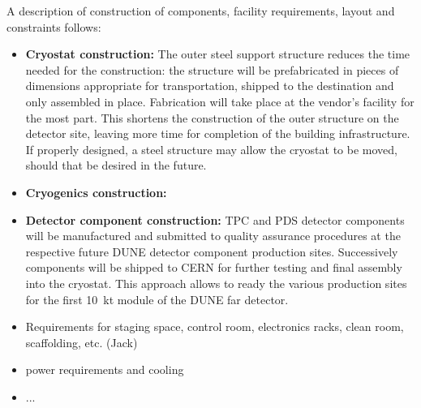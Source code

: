 \label{nuplatform}

A description of construction of components, facility requirements, layout and constraints follows:


\begin{itemize}

\item {\bf Cryostat construction:}
The outer steel support structure reduces the time needed for the construction: the structure will be prefabricated in pieces of dimensions appropriate for transportation, shipped to the destination and only assembled in place. Fabrication will take place at the vendor's facility for the most part. This shortens the construction of the outer structure on the detector site, leaving more time for completion of the building infrastructure. If properly designed, a steel structure may allow the cryostat to be moved, should that be desired in the future.

\item {\bf Cryogenics construction:}

\item {\bf Detector component construction:} 
TPC and PDS detector components will be manufactured and submitted to quality assurance procedures at the respective future DUNE detector component production sites. Successively components will be shipped to CERN for further testing and final assembly into the cryostat. This approach allows to ready the various production sites for the first 10~kt module of the DUNE far detector.

\item Requirements for staging space, control room, electronics racks, clean room, scaffolding, etc. (Jack)

\item power requirements and cooling 

\item ...

\end{itemize}



